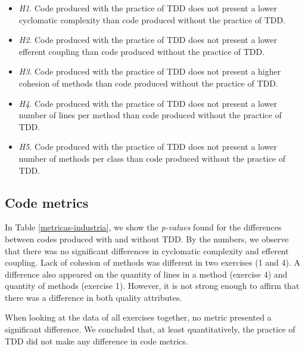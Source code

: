 \documentclass[times]{elsarticle}
\begin{document}
\begin{itemize}
	\item \textit{H1}. Code produced with the practice of TDD does not present a lower cyclomatic
	complexity than code produced without the practice of TDD.
	
	\item \textit{H2}. Code produced with the practice of TDD does not present a lower efferent
	coupling than code produced without the practice of TDD.
	
	\item \textit{H3}. Code produced with the practice of TDD does not present a higher cohesion
	of methods than code produced without the practice of TDD.
	
	\item \textit{H4}. Code produced with the practice of TDD does not present a lower number
	of lines per method than code produced without the practice of TDD.
	
	\item \textit{H5}. Code produced with the practice of TDD does not present a lower number of
	methods per class than code produced without the practice of TDD.
\end{itemize}

\subsection{Code metrics}

In Table \ref{metricas-industria}, we show the \textit{p-values} found for
the differences between codes produced with and without TDD. By the numbers,
we observe that there was no significant differences in cyclomatic complexity
and efferent coupling.
Lack of cohesion of methods was different in two exercises (1 and 4). A difference
also appeared on the quantity of lines in a method (exercise 4) and quantity of
methods (exercise 1). However, it is not strong enough to affirm that there was
a difference in both quality attributes.

When looking at the data of all exercises together, no metric presented a significant
difference. We concluded that, at least quantitatively, the practice of TDD did not
make any difference in code metrics.
\end{document}

